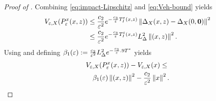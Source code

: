 \documentclass[twocolumn]{article}
\begin{document}
\begin{proof} [Proof of ]
  Combining \eqref{eq:impact-Lipschitz} and \eqref{eq:Veh-bound} yields
  \begin{align}
    \nonumber
    V_{\varepsilon, X}(P_{\varepsilon}^{x}(x, z)) &\leq \frac{c_{2}}{\varepsilon^{2}} e^{-\frac{c_{3}}{\varepsilon} T_{I}^{\varepsilon}(x, z)} \left\| \Delta_{X}(x, z) - \Delta_{X}(0, {\mathbf 0}) \right\|^{2}\\
    &\leq \frac{c_{2}}{\varepsilon^{2}} e^{-\frac{c_{3}}{\varepsilon} T_{I}^{\varepsilon}(x, z)} L_{\Delta}^{2} \left\| (x, z) \right\|^{2}.
  \end{align}
  Using  and defining $\beta_{1}(\varepsilon) := \frac{c_{2}}{\varepsilon^{2}} L_{\Delta}^{2} e^{-\frac{c_{3}}{\varepsilon} .9 T^{*}}$ yields
  \begin{align}
    \label{eq:DVeX-bounds}
    \lefteqn{\Vex(\Pex\argsxz) - \Vex(\zdx) \leq}\\
    \nonumber
    &&\bepsone \nzdxz^{2} - \frac{c_{2}}{\resclfparam^{2}} \nzdx^{2}.
  \end{align}


\end{proof}
\end{document}
